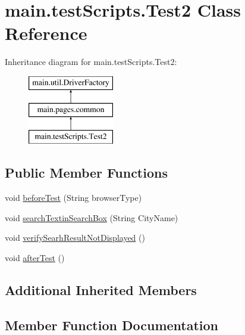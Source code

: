 \hypertarget{classmain_1_1test_scripts_1_1_test2}{}\section{main.\+test\+Scripts.\+Test2 Class Reference}
\label{classmain_1_1test_scripts_1_1_test2}
Inheritance diagram for main.\+test\+Scripts.\+Test2\+:\begin{figure}[H]
\begin{center}
\leavevmode
\includegraphics[height=3.000000cm]{classmain_1_1test_scripts_1_1_test2}
\end{center}
\end{figure}
\subsection*{Public Member Functions}
\begin{DoxyCompactItemize}
\item 
void \mbox{\hyperlink{classmain_1_1test_scripts_1_1_test2_add17ccdd24a07f4d61763a91b58071ff}{before\+Test}} (String browser\+Type)
\item 
void \mbox{\hyperlink{classmain_1_1test_scripts_1_1_test2_a6607310c15cc4d9f1ff7194d1cadf479}{search\+Textin\+Search\+Box}} (String City\+Name)
\item 
void \mbox{\hyperlink{classmain_1_1test_scripts_1_1_test2_a8cbf8c3569b59359240b66cc0bf45e08}{verify\+Searh\+Result\+Not\+Displayed}} ()
\item 
void \mbox{\hyperlink{classmain_1_1test_scripts_1_1_test2_aea588f2abffef056a18639409e0dddea}{after\+Test}} ()
\end{DoxyCompactItemize}
\subsection*{Additional Inherited Members}


\subsection{Member Function Documentation}
\mbox{\label{classmain_1_1test_scripts_1_1_test2_aea588f2abffef056a18639409e0dddea}} 
